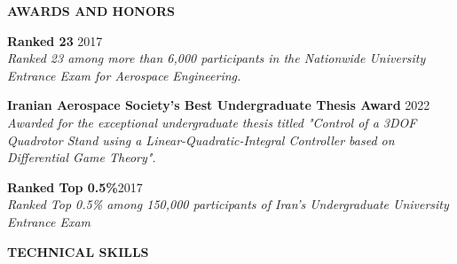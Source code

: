 \documentclass[12pt]{article}
\begin{document}
\vspace{0.2in} %


\begin{center}
	{\noindent \bfseries AWARDS AND HONORS}
\end{center}

 
\vspace{8pt} %


\noindent
{\bfseries Ranked 23} 
\hfill 2017 \vspace{4pt}\\
\textit{Ranked 23 among more than 6,000 participants in the Nationwide University Entrance Exam for Aerospace Engineering.}
\vspace{04pt}

\noindent
{\bfseries Iranian Aerospace Society's Best Undergraduate Thesis Award} 
\hfill 2022 \vspace{4pt} \\
\textit{Awarded for the exceptional
undergraduate thesis titled "Control of a 3DOF Quadrotor Stand using a Linear-Quadratic-Integral Controller 
based on Differential Game Theory".}

\vspace{02pt}
\noindent
{\bfseries Ranked Top 0.5\%}\hfill 2017 \vspace{4pt} \\ 
\textit{Ranked Top 0.5\% among 150,000 participants of Iran's Undergraduate University Entrance Exam}




\vspace{0.2in} %



\begin{center}
	{\noindent \bfseries TECHNICAL SKILLS}
\end{center}
\end{document}
